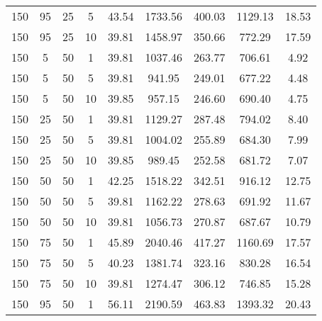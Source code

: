 \begin{table}[h]
\begin{tabular}{cccc|c|c|c|c|c}
150 & 95 & 25 & 5 & \cellcolor{gray!13}43.54 & \cellcolor{gray!1}1733.56 & \cellcolor{gray!1}400.03 & \cellcolor{gray!1}1129.13 & 18.53\\
150 & 95 & 25 & 10 & \cellcolor{gray!50}39.81 & \cellcolor{gray!1}1458.97 & \cellcolor{gray!1}350.66 & \cellcolor{gray!21}772.29 & 17.59\\
150 & 5 & 50 & 1 & \cellcolor{gray!50}39.81 & \cellcolor{gray!30}1037.46 & \cellcolor{gray!19}263.77 & \cellcolor{gray!41}706.61 & 4.92\\
150 & 5 & 50 & 5 & \cellcolor{gray!50}39.81 & \cellcolor{gray!48}941.95 & \cellcolor{gray!36}249.01 & \cellcolor{gray!50}677.22 & 4.48\\
150 & 5 & 50 & 10 & \cellcolor{gray!50}39.85 & \cellcolor{gray!45}957.15 & \cellcolor{gray!39}246.60 & \cellcolor{gray!46}690.40 & 4.75\\
150 & 25 & 50 & 1 & \cellcolor{gray!50}39.81 & \cellcolor{gray!13}1129.27 & \cellcolor{gray!1}287.48 & \cellcolor{gray!14}794.02 & 8.40\\
150 & 25 & 50 & 5 & \cellcolor{gray!50}39.81 & \cellcolor{gray!37}1004.02 & \cellcolor{gray!28}255.89 & \cellcolor{gray!48}684.30 & 7.99\\
150 & 25 & 50 & 10 & \cellcolor{gray!50}39.85 & \cellcolor{gray!39}989.45 & \cellcolor{gray!32}252.58 & \cellcolor{gray!49}681.72 & 7.07\\
150 & 50 & 50 & 1 & \cellcolor{gray!26}42.25 & \cellcolor{gray!1}1518.22 & \cellcolor{gray!1}342.51 & \cellcolor{gray!1}916.12 & 12.75\\
150 & 50 & 50 & 5 & \cellcolor{gray!50}39.81 & \cellcolor{gray!7}1162.22 & \cellcolor{gray!2}278.63 & \cellcolor{gray!46}691.92 & 11.67\\
150 & 50 & 50 & 10 & \cellcolor{gray!50}39.81 & \cellcolor{gray!27}1056.73 & \cellcolor{gray!11}270.87 & \cellcolor{gray!47}687.67 & 10.79\\
150 & 75 & 50 & 1 & \cellcolor{gray!1}45.89 & \cellcolor{gray!1}2040.46 & \cellcolor{gray!1}417.27 & \cellcolor{gray!1}1160.69 & 17.57\\
150 & 75 & 50 & 5 & \cellcolor{gray!46}40.23 & \cellcolor{gray!1}1381.74 & \cellcolor{gray!1}323.16 & \cellcolor{gray!3}830.28 & 16.54\\
150 & 75 & 50 & 10 & \cellcolor{gray!50}39.81 & \cellcolor{gray!1}1274.47 & \cellcolor{gray!1}306.12 & \cellcolor{gray!29}746.85 & 15.28\\
150 & 95 & 50 & 1 & \cellcolor{gray!1}56.11 & \cellcolor{gray!1}2190.59 & \cellcolor{gray!1}463.83 & \cellcolor{gray!1}1393.32 & 20.43\\

\end{tabular}
\end{table}
